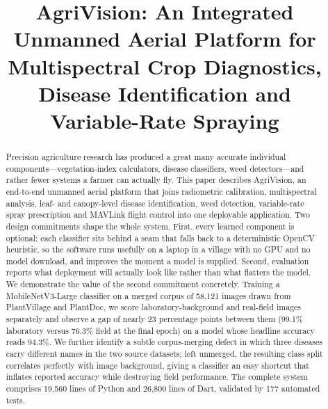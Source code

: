 \documentclass[conference]{IEEEtran}
\begin{document}
\title{AgriVision: An Integrated Unmanned Aerial Platform for\\
Multispectral Crop Diagnostics, Disease Identification and\\
Variable-Rate Spraying}

\author{
}

\maketitle

\begin{abstract}
Precision agriculture research has produced a great many accurate individual
components---vegetation-index calculators, disease classifiers, weed
detectors---and rather fewer systems a farmer can actually fly. This paper
describes AgriVision, an end-to-end unmanned aerial platform that joins
radiometric calibration, multispectral analysis, leaf- and canopy-level disease
identification, weed detection, variable-rate spray prescription and MAVLink
flight control into one deployable application. Two design commitments shape
the whole system. First, every learned component is optional: each classifier
sits behind a seam that falls back to a deterministic OpenCV heuristic, so the
software runs usefully on a laptop in a village with no GPU and no model
download, and improves the moment a model is supplied. Second, evaluation
reports what deployment will actually look like rather than what flatters the
model. We demonstrate the value of the second commitment concretely. Training a
MobileNetV3-Large classifier on a merged corpus of 58{,}121 images drawn from
PlantVillage and PlantDoc, we score laboratory-background and real-field images
separately and observe a gap of nearly 23 percentage points between them
(99.1\% laboratory versus 76.3\% field at the final epoch) on a model whose
headline accuracy reads 94.3\%. We further identify a subtle corpus-merging defect in which three
diseases carry different names in the two source datasets; left unmerged, the
resulting class split correlates perfectly with image background, giving a
classifier an easy shortcut that inflates reported accuracy while destroying
field performance. The complete system comprises 19{,}560 lines of Python and
26{,}800 lines of Dart, validated by 177 automated tests.
\end{abstract}
\end{document}
